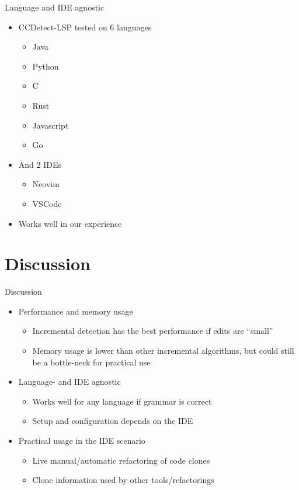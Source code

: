 \documentclass[aspectratio=1610, xcolor=table]{beamer}
\begin{document}
\begin{frame}{Language and IDE agnostic}
    \begin{itemize}
        \item CCDetect-LSP tested on 6 languages
            \begin{itemize}
                \item Java
                \item Python
                \item C
                \item Rust
                \item Javascript
                \item Go
            \end{itemize}
        \item And 2 IDEs
            \begin{itemize}
                \item Neovim
                \item VSCode
            \end{itemize}
        \item Works well in our experience
    \end{itemize}

\end{frame}
    
\section{Discussion}
\begin{frame}{Discussion}
    \begin{itemize}
        \item Performance and memory usage
            \begin{itemize}
                \item Incremental detection has the best performance if edits are ``small''
                \item Memory usage is lower than other incremental algorithms, but could still be a
                    bottle-neck for practical use
            \end{itemize}
        \item Language- and IDE agnostic
            \begin{itemize}
                \item Works well for any language if grammar is correct
                \item Setup and configuration depends on the IDE
            \end{itemize}
		\item Practical usage in the IDE scenario
            \begin{itemize}
                \item Live manual/automatic refactoring of code clones
                \item Clone information used by other tools/refactorings
            \end{itemize}
    \end{itemize}
\end{frame}
\end{document}
